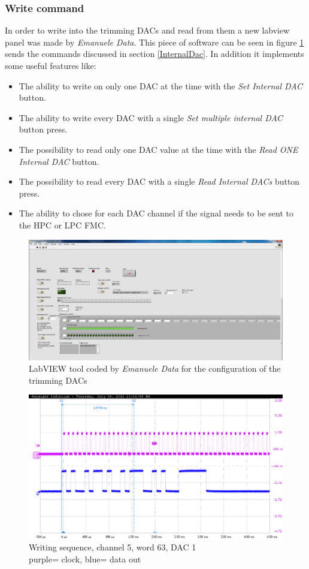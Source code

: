 \subsubsection{Write command}
\noindent In order to write into the trimming DACs and read from them a new labview panel was made by \textit{Emanuele Data}\cite{data}. This piece of software can be seen in figure \ref{fig:labview3} sends the commands discussed in section \ref{InternalDac}. In addition it implements some useful features like:
\begin{itemize}
	\item The ability to write on only one DAC at the time with the \textit{Set Internal DAC} button.
	\item The ability to write every DAC with a single \textit{Set multiple internal DAC} button press.
	\item The possibility to read only one DAC value at the time with the \textit{Read ONE Internal DAC} button.
	\item The possibility to read every DAC with a single \textit{Read Internal DACs} button press.
	\item The ability to chose for each DAC channel if the signal needs to be sent to the HPC or LPC FMC.
\end{itemize}
\begin{figure}[H]
	\centering
	\includegraphics[width=0.99\linewidth]{IMG/ch3/LABVIEW2}
	\caption{LabVIEW tool coded by \textit{Emanuele Data} for the configuration of the trimming DACs}
	\label{fig:labview3}
\end{figure}
\begin{figure}[H]
	\centering
	\includegraphics[width=0.7\linewidth]{IMG/ch5/probe/09-08-2021_ch05-write63-baselinedac1}
	\caption{Writing sequence, channel 5, word 63, DAC 1\\{\color{magenta}purple}= clock, {\color{blue}blue}= data out}
	\label{fig:ch05write63}
\end{figure}
